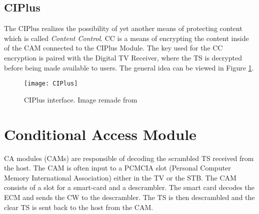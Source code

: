 \subsection{CIPlus}
The CIPlus realizes the possibility of yet another means of protecting content 
which is called \emph{Content Control}. CC is a means of encrypting the content 
inside of the CAM connected to the CIPlus Module. The key used for the CC 
encryption is paired with the Digital TV Receiver, where the TS is decrypted 
before being made available to users. The general idea can be viewed in Figure 
\ref{img:CIPlus}.

\begin{figure}
  \centering
  \texttt{[image: CIPlus]}
  \caption{CIPlus interface. Image remade from \citep[p. 10]{CI+:2011}}
  \label{img:CIPlus}
\end{figure}


\section{Conditional Access Module}\label{sec:CAM}
CA modules (CAMs) are responsible of decoding the scrambled TS received from the 
host. The CAM is often input to a PCMCIA slot (Personal Computer Memory 
International Association) either in the TV or the STB. The CAM consists of a 
slot for a smart-card and a descrambler. The smart card decodes the ECM and 
sends the CW to the descrambler. The TS is then descrambled and the clear TS is 
sent back to the host from the CAM.
